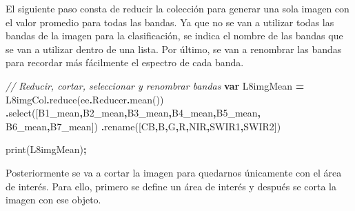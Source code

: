 \documentclass[
  12pt,
  letterpaper,
  twoside]{book}
\newenvironment{Shaded}{\begin{snugshade}}{\end{snugshade}}
\newcommand{\AttributeTok}[1]{\textcolor[rgb]{0.77,0.63,0.00}{#1}}
\newcommand{\CommentTok}[1]{\textcolor[rgb]{0.56,0.35,0.01}{\textit{#1}}}
\newcommand{\FunctionTok}[1]{\textcolor[rgb]{0.00,0.00,0.00}{#1}}
\newcommand{\KeywordTok}[1]{\textcolor[rgb]{0.13,0.29,0.53}{\textbf{#1}}}
\newcommand{\NormalTok}[1]{#1}
\newcommand{\OperatorTok}[1]{\textcolor[rgb]{0.81,0.36,0.00}{\textbf{#1}}}
\newcommand{\StringTok}[1]{\textcolor[rgb]{0.31,0.60,0.02}{#1}}
\begin{document}
El siguiente paso consta de reducir la colección para generar una sola imagen con el valor promedio para todas las bandas. Ya que no se van a utilizar todas las bandas de la imagen para la clasificación, se indica el nombre de las bandas que se van a utilizar dentro de una lista. Por último, se van a renombrar las bandas para recordar más fácilmente el espectro de cada banda.

\begin{Shaded}
\begin{Highlighting}[]
\CommentTok{// Reducir, cortar, seleccionar y renombrar bandas}
\KeywordTok{var}\NormalTok{ L8imgMean }\OperatorTok{=}\NormalTok{ L8imgCol}\OperatorTok{.}\FunctionTok{reduce}\NormalTok{(ee}\OperatorTok{.}\AttributeTok{Reducer}\OperatorTok{.}\FunctionTok{mean}\NormalTok{())}
  \OperatorTok{.}\FunctionTok{select}\NormalTok{([}\StringTok{\textquotesingle{}B1\_mean\textquotesingle{}}\OperatorTok{,}\StringTok{\textquotesingle{}B2\_mean\textquotesingle{}}\OperatorTok{,}\StringTok{\textquotesingle{}B3\_mean\textquotesingle{}}\OperatorTok{,}\StringTok{\textquotesingle{}B4\_mean\textquotesingle{}}\OperatorTok{,}\StringTok{\textquotesingle{}B5\_mean\textquotesingle{}}\OperatorTok{,}
  \StringTok{\textquotesingle{}B6\_mean\textquotesingle{}}\OperatorTok{,}\StringTok{\textquotesingle{}B7\_mean\textquotesingle{}}\NormalTok{])}
  \OperatorTok{.}\FunctionTok{rename}\NormalTok{([}\StringTok{\textquotesingle{}CB\textquotesingle{}}\OperatorTok{,}\StringTok{\textquotesingle{}B\textquotesingle{}}\OperatorTok{,}\StringTok{\textquotesingle{}G\textquotesingle{}}\OperatorTok{,}\StringTok{\textquotesingle{}R\textquotesingle{}}\OperatorTok{,}\StringTok{\textquotesingle{}NIR\textquotesingle{}}\OperatorTok{,}\StringTok{\textquotesingle{}SWIR1\textquotesingle{}}\OperatorTok{,}\StringTok{\textquotesingle{}SWIR2\textquotesingle{}}\NormalTok{])}

\FunctionTok{print}\NormalTok{(L8imgMean)}\OperatorTok{;}
\end{Highlighting}
\end{Shaded}

Posteriormente se va a cortar la imagen para quedarnos únicamente con el área de interés. Para ello, primero se define un área de interés y después se corta la imagen con ese objeto.
\end{document}
